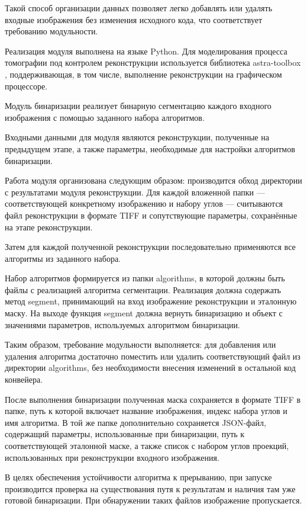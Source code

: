 Такой способ организации данных позволяет легко добавлять или удалять входные изображения без изменения исходного кода, что соответствует требованию модульности.

Реализация модуля выполнена на языке Python. Для моделирования процесса томографии под контролем реконструкции используется библиотека astra-toolbox \cite{van2016fast}, поддерживающая, в том числе, выполнение реконструкции на графическом процессоре.

Модуль бинаризации реализует бинарную сегментацию каждого входного изображения с помощью заданного набора алгоритмов.

Входными данными для модуля являются реконструкции, полученные на предыдущем этапе, а также параметры, необходимые для настройки алгоритмов бинаризации.

Работа модуля организована следующим образом: производится обход директории с результатами модуля реконструкции. Для каждой вложенной папки — соответствующей конкретному изображению и набору углов — считываются файл реконструкции в формате TIFF и сопутствующие параметры, сохранённые на этапе реконструкции.

Затем для каждой полученной реконструкции последовательно применяются все алгоритмы из заданного набора.

Набор алгоритмов формируется из папки algorithms, в которой должны быть файлы с реализацией алгоритма сегментации. Реализация должна содержать метод segment, принимающий на вход изображение реконструкции и эталонную маску. На выходе функция segment должна вернуть бинаризацию и объект с значениями параметров, используемых алгоритмом бинаризации. 

Таким образом, требование модульности выполняется: для добавления или удаления алгоритма достаточно поместить или удалить соответствующий файл из директории algorithms, без необходимости внесения изменений в остальной код конвейера.

После выполнения бинаризации полученная маска сохраняется в формате TIFF в папке, путь к которой включает название изображения, индекс набора углов и имя алгоритма. В той же папке дополнительно сохраняется JSON-файл, содержащий параметры, использованные при бинаризации, путь к соответствующей эталонной маске, а также список с набором углов проекций, использованных при реконструкции входного изображения.

В целях обеспечения устойчивости алгоритма к прерыванию, при запуске производится проверка на существования путя к результатам и наличия там уже готовой бинаризации. При обнаружении таких файлов изображение пропускается. 

